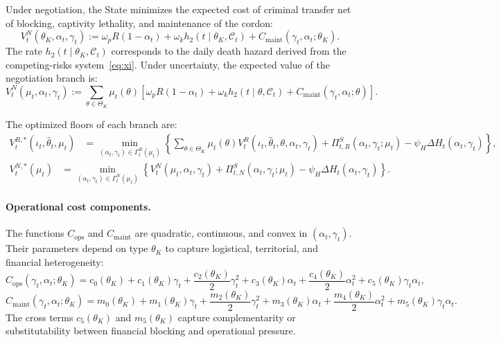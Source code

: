 \documentclass[12pt,a4paper]{article}
\theoremstyle{plain}
\theoremstyle{definition}
\theoremstyle{remark}
\newcommand{\1}{\mathbf{1}}
\begin{document}
Under negotiation, the State minimizes the expected cost of criminal transfer net of blocking, captivity lethality, and maintenance of the cordon:
\begin{equation}
\label{eq:state-loss-neg-branch}
V_t^N(\theta_K,\alpha_t,\gamma_t)
:=
\omega_pR(1-\alpha_t)
+\omega_k h_2(t\mid\theta_K,\mathcal C_t)
+C_{\mathrm{maint}}(\gamma_t,\alpha_t;\theta_K).
\end{equation}
The rate $h_2(t\mid\theta_K,\mathcal C_t)$ corresponds to the daily death hazard derived from the competing-risks system~\eqref{eq:xi}. Under uncertainty, the expected value of the negotiation branch is:
\begin{equation}
\label{eq:negotiation-cost}
V_t^N(\mu_t,\alpha_t,\gamma_t)
:=
\sum_{\theta\in\Theta_K}\mu_t(\theta)
\left[
\omega_pR(1-\alpha_t)
+\omega_k h_2(t\mid\theta,\mathcal C_t)
+C_{\mathrm{maint}}(\gamma_t,\alpha_t;\theta)
\right].
\end{equation}

The optimized floors of each branch are:
\begin{equation}
\label{eq:rescue-cost}
\begin{aligned}
V_t^{R,*}(\iota_t,\hat{\theta}_t,\mu_t)
&=
\min_{(\alpha_t,\gamma_t)\in\Gamma_t^R(\mu_t)}
\left\{
\sum_{\theta\in\Theta_K}\mu_t(\theta)
V_t^R(\iota_t,\hat{\theta}_t,\theta,\alpha_t,\gamma_t)
+\Pi_{t,R}^{S}(\alpha_t,\gamma_t;\mu_t)
-\psi_H\Delta H_t(\alpha_t,\gamma_t)
\right\},
\end{aligned}
\end{equation}
\begin{equation}
\label{eq:negotiation-piso}
\begin{aligned}
V_t^{N,*}(\mu_t)
&=
\min_{(\alpha_t,\gamma_t)\in\Gamma_t^N(\mu_t)}
\left\{
V_t^N(\mu_t,\alpha_t,\gamma_t)
+\Pi_{t,N}^{S}(\alpha_t,\gamma_t;\mu_t)
-\psi_H\Delta H_t(\alpha_t,\gamma_t)
\right\}.
\end{aligned}
\end{equation}

\paragraph{Operational cost components.}
The functions $C_{\mathrm{ops}}$ and $C_{\mathrm{maint}}$ are quadratic, continuous, and convex in $(\alpha_t,\gamma_t)$. Their parameters depend on type $\theta_K$ to capture logistical, territorial, and financial heterogeneity:
\begin{equation}
\label{eq:cops-quadratic}
C_{\mathrm{ops}}(\gamma_t,\alpha_t;\theta_K)
=
c_0(\theta_K)+c_1(\theta_K)\gamma_t+\frac{c_2(\theta_K)}{2}\gamma_t^2
+c_3(\theta_K)\alpha_t+\frac{c_4(\theta_K)}{2}\alpha_t^2
+c_5(\theta_K)\gamma_t\alpha_t,
\end{equation}
\begin{equation}
\label{eq:cmaint-quadratic}
C_{\mathrm{maint}}(\gamma_t,\alpha_t;\theta_K)
=
m_0(\theta_K)+m_1(\theta_K)\gamma_t+\frac{m_2(\theta_K)}{2}\gamma_t^2
+m_3(\theta_K)\alpha_t+\frac{m_4(\theta_K)}{2}\alpha_t^2
+m_5(\theta_K)\gamma_t\alpha_t.
\end{equation}
The cross terms $c_5(\theta_K)$ and $m_5(\theta_K)$ capture complementarity or substitutability between financial blocking and operational pressure.
\end{document}
